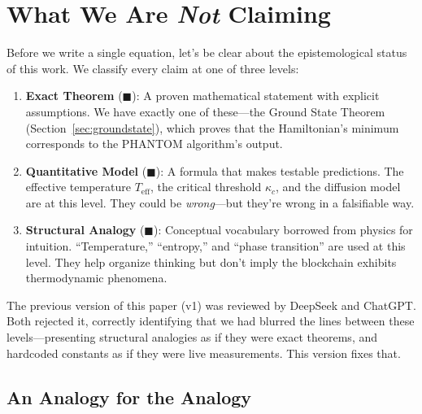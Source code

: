 \documentclass[11pt,a4paper]{article}
\begin{document}
\section{What We Are \emph{Not} Claiming}

Before we write a single equation, let's be clear about the epistemological status of this work. We classify every claim at one of three levels:

\begin{susskindbox}
\begin{enumerate}
    \item \textbf{Exact Theorem} (\textcolor{measured}{$\blacksquare$}): A proven mathematical statement with explicit assumptions. We have exactly one of these---the Ground State Theorem (Section~\ref{sec:groundstate}), which proves that the Hamiltonian's minimum corresponds to the PHANTOM algorithm's output.

    \item \textbf{Quantitative Model} (\textcolor{hardcoded}{$\blacksquare$}): A formula that makes testable predictions. The effective temperature $T_{\text{eff}}$, the critical threshold $\kappa_c$, and the diffusion model are at this level. They could be \emph{wrong}---but they're wrong in a falsifiable way.

    \item \textbf{Structural Analogy} (\textcolor{theoretical}{$\blacksquare$}): Conceptual vocabulary borrowed from physics for intuition. ``Temperature,'' ``entropy,'' and ``phase transition'' are used at this level. They help organize thinking but don't imply the blockchain exhibits thermodynamic phenomena.
\end{enumerate}
\end{susskindbox}

The previous version of this paper (v1) was reviewed by DeepSeek and ChatGPT. Both rejected it, correctly identifying that we had blurred the lines between these levels---presenting structural analogies as if they were exact theorems, and hardcoded constants as if they were live measurements. This version fixes that.

\subsection{An Analogy for the Analogy}
\end{document}
